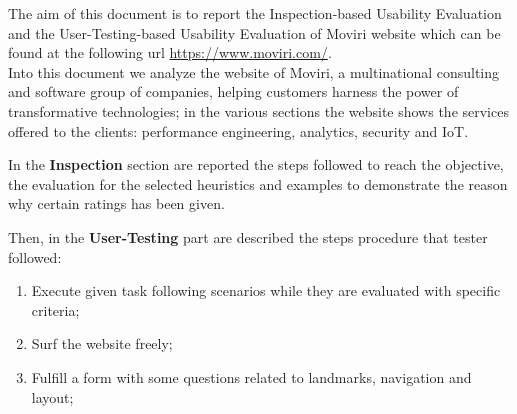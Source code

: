 The aim of this document is to report the Inspection-based Usability Evaluation and the User-Testing-based Usability Evaluation of Moviri website which can be found at the following url \url{https://www.moviri.com/}.  
\\
Into this document we analyze the website of Moviri, a multinational consulting and software group of companies, helping customers harness the power of transformative technologies; in the various sections the website shows the services offered to the clients: performance engineering, analytics, security and IoT. 
\par
In the \textbf{Inspection} section are reported the steps followed to reach the objective, the evaluation for the selected heuristics and examples to demonstrate the reason why certain ratings has been given. 
\par
Then, in the \textbf{User-Testing} part are described the steps procedure that tester followed: 
\begin{enumerate} 
\item Execute given task following scenarios while they are evaluated with specific criteria;\item Surf the website freely;
\item Fulfill a form with some questions related to landmarks, navigation and layout; 
\end{enumerate}

 